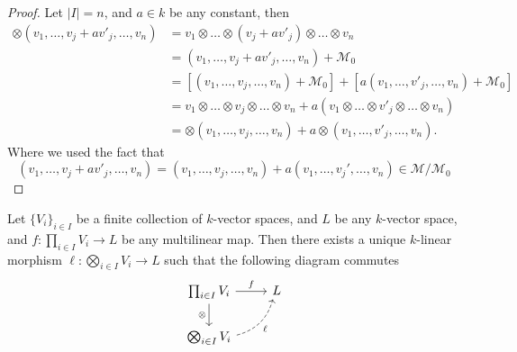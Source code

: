 \begin{proof}
    Let \(|I| = n\), and \(a \in k\) be any constant, then
    \begin{align*}
        \otimes(v_1, \dots, v_j + a v'_j, \dots, v_n)
            &= v_1 \otimes \dots \otimes (v_j + a v'_j) \otimes \dots \otimes v_n \\
            &= (v_1, \dots, v_j + a v'_j, \dots, v_n) + \mathcal M_0 \\
            &= [(v_1, \dots, v_j, \dots, v_n) + \mathcal M_0]
               + [a (v_1, \dots, v'_j, \dots, v_n) + \mathcal M_0] \\
            &= v_1 \otimes \dots \otimes v_j \otimes \dots \otimes v_n
               + a(v_1 \otimes \dots \otimes v'_j \otimes \dots \otimes v_n) \\
            &= \otimes(v_1, \dots, v_j, \dots, v_n) 
               + a \otimes(v_1, \dots, v'_j, \dots, v_n).
    \end{align*}
    Where we used the fact that
    \[
        (v_1, \dots, v_j + a v'_j, \dots, v_n)
            = (v_1, \dots, v_j, \dots, v_n) + a (v_1, \dots, v_j', \dots, v_n)
        \in \mathcal M / \mathcal M_{0}
    \]
\end{proof}

\begin{theorem}
    \label{thm: universal property of tensor products}
    Let \(\{V_i\}_{i \in I}\) be a finite collection of \(k\)-vector spaces, and
    \(L\) be any \(k\)-vector space, and \(f: \prod_{i \in I} V_i \to L\) be any
    multilinear map. Then there exists a unique \(k\)-linear morphism \(\ell :
    \bigotimes_{i \in I} V_i \to L\) such that the following diagram commutes
    \[
        \begin{tikzcd}
            \prod_{i \in I} V_i
            \ar[r, "f"]
            \ar[d, swap, "\otimes"]
            &L \\
            \bigotimes_{i \in I} V_i
            \ar[ur, swap, bend right, dashed, "\ell"]
        \end{tikzcd}
    \]
\end{theorem}

